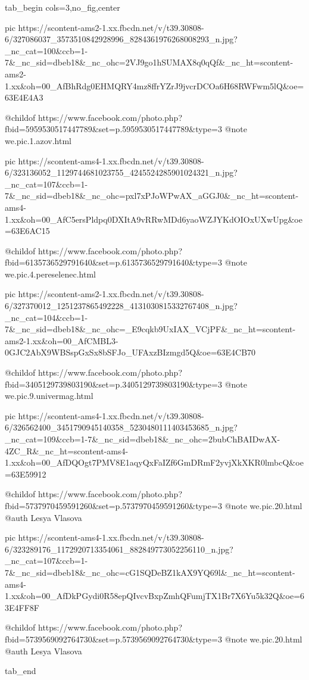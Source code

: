  
 
 
 
 


\ifcmt
  tab_begin cols=3,no_fig,center

     pic https://scontent-ams2-1.xx.fbcdn.net/v/t39.30808-6/327086037_3573510842928996_8284361976268008293_n.jpg?_nc_cat=100&ccb=1-7&_nc_sid=dbeb18&_nc_ohc=2VJ9go1hSUMAX8q0qQf&_nc_ht=scontent-ams2-1.xx&oh=00_AfBhRdg0EHMQRY4mz8ffrYZrJ9jvcrDCOa6H68RWFwm5lQ&oe=63E4E4A3

     @childof https://www.facebook.com/photo.php?fbid=5959530517447789&set=p.5959530517447789&type=3
     @note we.pic.1.azov.html

     pic https://scontent-ams4-1.xx.fbcdn.net/v/t39.30808-6/323136052_1129744681023755_4245524285901024321_n.jpg?_nc_cat=107&ccb=1-7&_nc_sid=dbeb18&_nc_ohc=pxl7xPJoWPwAX_aGGJ0&_nc_ht=scontent-ams4-1.xx&oh=00_AfC5ersPldpq0DXItA9vRRwMDd6yaoWZJYKdOIOxUXwUpg&oe=63E6AC15

     @childof https://www.facebook.com/photo.php?fbid=6135736529791640&set=p.6135736529791640&type=3
     @note we.pic.4.pereselenec.html

     pic https://scontent-ams2-1.xx.fbcdn.net/v/t39.30808-6/327370012_1251237865492228_4131030815332767408_n.jpg?_nc_cat=104&ccb=1-7&_nc_sid=dbeb18&_nc_ohc=_E9cqkb9UxIAX_VCjPF&_nc_ht=scontent-ams2-1.xx&oh=00_AfCMBL3-0GJC2AbX9WBSspGxSx8bSFJo_UFAxzBIzmgd5Q&oe=63E4CB70

     @childof https://www.facebook.com/photo.php?fbid=3405129739803190&set=p.3405129739803190&type=3
     @note we.pic.9.univermag.html

     pic https://scontent-ams4-1.xx.fbcdn.net/v/t39.30808-6/326562400_3451790945140358_5230480111403453685_n.jpg?_nc_cat=109&ccb=1-7&_nc_sid=dbeb18&_nc_ohc=2bubChBAIDwAX-4ZC_R&_nc_ht=scontent-ams4-1.xx&oh=00_AfDQOgt7PMV8E1aqyQxFaIZf6GmDRmF2yvjXkXKR0lmbcQ&oe=63E59912

     @childof https://www.facebook.com/photo.php?fbid=5737970459591260&set=p.5737970459591260&type=3
     @note we.pic.20.html
     @auth Lesya Vlasova

     pic https://scontent-ams4-1.xx.fbcdn.net/v/t39.30808-6/323289176_1172920713354061_882849773052256110_n.jpg?_nc_cat=107&ccb=1-7&_nc_sid=dbeb18&_nc_ohc=cG1SQDeBZ1kAX9YQ69l&_nc_ht=scontent-ams4-1.xx&oh=00_AfDkPGydi0R58epQIvcvBxpZmhQFumjTX1Br7X6Yu5k32Q&oe=63E4FF8F

     @childof https://www.facebook.com/photo.php?fbid=5739569092764730&set=p.5739569092764730&type=3
     @note we.pic.20.html
     @auth Lesya Vlasova

  tab_end
\fi

